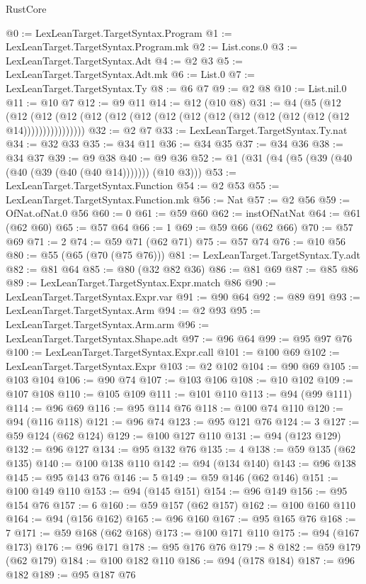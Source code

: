 \begin{lexlean}{RustCore}
\begin{coremodule}
@0 := LexLeanTarget.TargetSyntax.Program
@1 := LexLeanTarget.TargetSyntax.Program.mk
@2 := List.cons.{0}
@3 := LexLeanTarget.TargetSyntax.Adt
@4 := @2 @3
@5 := LexLeanTarget.TargetSyntax.Adt.mk
@6 := List.{0}
@7 := LexLeanTarget.TargetSyntax.Ty
@8 := @6 @7
@9 := @2 @8
@10 := List.nil.{0}
@11 := @10 @7
@12 := @9 @11
@14 := @12 (@10 @8)
@31 := @4
    (@5
      (@12 (@12 (@12 (@12 (@12 (@12 (@12 (@12 (@12 (@12 (@12 (@12 (@12 (@12 (@12 @14))))))))))))))))
@32 := @2 @7
@33 := LexLeanTarget.TargetSyntax.Ty.nat
@34 := @32 @33
@35 := @34 @11
@36 := @34 @35
@37 := @34 @36
@38 := @34 @37
@39 := @9 @38
@40 := @9 @36
@52 := @1 (@31 (@4 (@5 (@39 (@40 (@40 (@39 (@40 (@40 @14))))))) (@10 @3)))
@53 := LexLeanTarget.TargetSyntax.Function
@54 := @2 @53
@55 := LexLeanTarget.TargetSyntax.Function.mk
@56 := Nat
@57 := @2 @56
@59 := OfNat.ofNat.{0} @56
@60 := 0
@61 := @59 @60
@62 := instOfNatNat
@64 := @61 (@62 @60)
@65 := @57 @64
@66 := 1
@69 := @59 @66 (@62 @66)
@70 := @57 @69
@71 := 2
@74 := @59 @71 (@62 @71)
@75 := @57 @74
@76 := @10 @56
@80 := @55 (@65 (@70 (@75 @76)))
@81 := LexLeanTarget.TargetSyntax.Ty.adt
@82 := @81 @64
@85 := @80 (@32 @82 @36)
@86 := @81 @69
@87 := @85 @86
@89 := LexLeanTarget.TargetSyntax.Expr.match @86
@90 := LexLeanTarget.TargetSyntax.Expr.var
@91 := @90 @64
@92 := @89 @91
@93 := LexLeanTarget.TargetSyntax.Arm
@94 := @2 @93
@95 := LexLeanTarget.TargetSyntax.Arm.arm
@96 := LexLeanTarget.TargetSyntax.Shape.adt
@97 := @96 @64
@99 := @95 @97 @76
@100 := LexLeanTarget.TargetSyntax.Expr.call
@101 := @100 @69
@102 := LexLeanTarget.TargetSyntax.Expr
@103 := @2 @102
@104 := @90 @69
@105 := @103 @104
@106 := @90 @74
@107 := @103 @106
@108 := @10 @102
@109 := @107 @108
@110 := @105 @109
@111 := @101 @110
@113 := @94 (@99 @111)
@114 := @96 @69
@116 := @95 @114 @76
@118 := @100 @74 @110
@120 := @94 (@116 @118)
@121 := @96 @74
@123 := @95 @121 @76
@124 := 3
@127 := @59 @124 (@62 @124)
@129 := @100 @127 @110
@131 := @94 (@123 @129)
@132 := @96 @127
@134 := @95 @132 @76
@135 := 4
@138 := @59 @135 (@62 @135)
@140 := @100 @138 @110
@142 := @94 (@134 @140)
@143 := @96 @138
@145 := @95 @143 @76
@146 := 5
@149 := @59 @146 (@62 @146)
@151 := @100 @149 @110
@153 := @94 (@145 @151)
@154 := @96 @149
@156 := @95 @154 @76
@157 := 6
@160 := @59 @157 (@62 @157)
@162 := @100 @160 @110
@164 := @94 (@156 @162)
@165 := @96 @160
@167 := @95 @165 @76
@168 := 7
@171 := @59 @168 (@62 @168)
@173 := @100 @171 @110
@175 := @94 (@167 @173)
@176 := @96 @171
@178 := @95 @176 @76
@179 := 8
@182 := @59 @179 (@62 @179)
@184 := @100 @182 @110
@186 := @94 (@178 @184)
@187 := @96 @182
@189 := @95 @187 @76

\end{coremodule}
\end{lexlean}
